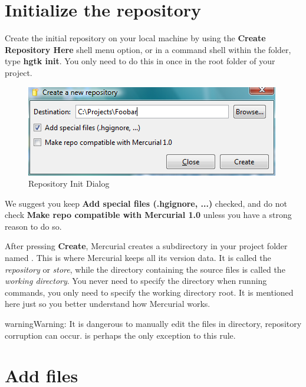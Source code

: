 \documentclass[letterpaper,10pt,english]{manual}
\begin{document}
\section{Initialize the repository}

Create the initial repository on your local machine by using the
\textbf{Create Repository Here} shell menu option, or in a command
shell within the folder, type \textbf{hgtk init}.  You only need to do
this in once in the root folder of your project.
\begin{figure}[htbp]
\centering

\includegraphics{init.png}
\caption{Repository Init Dialog}\end{figure}

We suggest you keep \textbf{Add special files (.hgignore, ...)}
checked, and do not check
\textbf{Make repo compatible with Mercurial 1.0}
unless you have a strong reason to do so.

After pressing \textbf{Create}, Mercurial creates a subdirectory in
your project folder named . This is where Mercurial keeps all
its version data.  It is called the \emph{repository} or \emph{store}, while the
directory containing the source files is called the \emph{working directory}.
You never need to specify the  directory when running
commands, you only need to specify the working directory root.  It is
mentioned here just so you better understand how Mercurial works.

\begin{notice}{warning}{Warning:}
It is dangerous to manually edit the files in  directory,
repository corruption can occur.   is perhaps the
only exception to this rule.
\end{notice}


\section{Add files}
\end{document}

